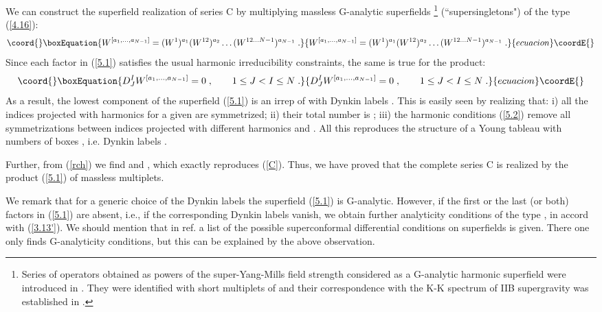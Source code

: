 \documentclass[a4paper,12pt]{article}
\begin{document}
We can construct the superfield realization of series C by 
multiplying massless G-analytic superfields \footnote{Series of 
operators obtained as powers of the \coordHE{} super-Yang-Mills field 
strength considered as a G-analytic harmonic superfield were 
introduced in \cite{HWest}. They were identified with short 
multiplets of \coordHE{} and their correspondence with the K-K 
spectrum of IIB supergravity was established in \cite{AF}.} 
(``supersingletons") of the type (\ref{4.16}): 
\begin{equation}\coord{}\boxEquation{\label{5.1}
 W^{[a_1,\ldots,a_{N-1}]} = (W^1)^{a_1}(W^{12})^{a_2}\ldots 
(W^{12\ldots N-1})^{a_{N-1}}\;.
}{W^{[a_1,\ldots,a_{N-1}]} = (W^1)^{a_1}(W^{12})^{a_2}\ldots 
(W^{12\ldots N-1})^{a_{N-1}}\;.
}{ecuacion}\coordE{}\end{equation}
Since each factor in (\ref{5.1}) satisfies the usual harmonic 
irreducibility constraints, the same is true for the product: 
\begin{equation}\coord{}\boxEquation{\label{5.2}
  D^I_J W^{[a_1,\ldots,a_{N-1}]} = 0\;, \qquad 1\leq J < I \leq 
N\;.
}{D^I_J W^{[a_1,\ldots,a_{N-1}]} = 0\;, \qquad 1\leq J < I \leq 
N\;.
}{ecuacion}\coordE{}\end{equation}
As a result, the lowest component of the superfield (\ref{5.1}) is 
an irrep of \coordHE{} with Dynkin labels 
\myHighlight{$[a_1,\ldots,a_{N-1}]$}\coordHE{}. This is easily seen by realizing that: i) 
all the \coordHE{} indices projected with harmonics \coordHE{} 
for a given \coordHE{} are symmetrized; ii) their total number is 
\coordHE{}; iii) the harmonic conditions 
(\ref{5.2}) remove all symmetrizations between indices projected 
with different harmonics \coordHE{} and \coordHE{}. All this reproduces 
the structure of a Young tableau with numbers of boxes 
\coordHE{}, i.e. Dynkin labels 
\myHighlight{$[a_1,\ldots,a_{N-1}]$}\coordHE{}. 

Further, from (\ref{rch}) we find \coordHE{} and \coordHE{}, which exactly reproduces (\ref{C}). Thus, we have proved 
that the complete series C is realized by the product (\ref{5.1}) 
of massless multiplets. 

We remark that for a generic choice of the Dynkin labels the 
superfield (\ref{5.1}) is \coordHE{} G-analytic. However, if the 
first \coordHE{} or the last \coordHE{} (or both) factors in (\ref{5.1}) are 
absent, i.e., if the corresponding Dynkin labels vanish, we obtain 
further analyticity conditions of the type \coordHE{}, in accord 
with (\ref{3.13'}). We should mention that in ref. \cite{dp} a 
list of the possible superconformal differential conditions on 
superfields is given. There one only finds \coordHE{} G-analyticity 
conditions, but this can be explained by the above observation.   
\end{document}
